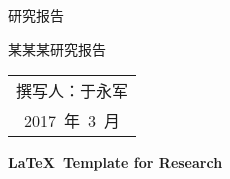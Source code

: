 
\begin{titlepage}
	\begin{center}
		
		\vspace{1.5em}
		\begin{center} {\erhao 研究报告}\end{center}
		
		\vspace{10.5em}
		\begin{center} {\erhao\hei 某某某研究报告}\end{center}
		
		\vspace{20em}
		{\sanhao
			\begin{center} \renewcommand{\arraystretch}{1.75}
				\begin{tabular}{c}
					撰写人：于永军 \\
					2017~年~3~月 \\
				\end{tabular} \renewcommand{\arraystretch}{1}
			\end{center} 
		}
	\end{center}
	\clearpage{\pagestyle{empty}\cleardoublepage}
	
	\newpage\thispagestyle{empty}
	\begin{center}
		\parbox[t][0.7cm][t]{\textwidth}{}
		
		\begin{center}{\bfseries \sanhao \LaTeX~Template for Research}\end{center}
		
		\vspace{4.7cm}
		{\sanhao
		}
			

\end{center}
\end{titlepage}
